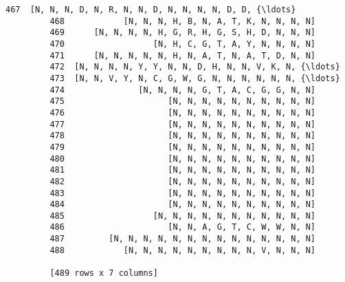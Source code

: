 \documentclass[11pt]{article}
\begin{document}
\begin{Verbatim}[commandchars=\\\{\}]
         467  [N, N, N, D, N, R, N, N, D, N, N, N, N, D, D, {\ldots}  
         468            [N, N, N, H, B, N, A, T, K, N, N, N, N]  
         469      [N, N, N, N, H, G, R, H, G, S, H, D, N, N, N]  
         470                  [N, H, C, G, T, A, Y, N, N, N, N]  
         471      [N, N, N, N, N, H, N, A, T, N, A, T, D, N, N]  
         472  [N, N, N, N, Y, Y, N, N, D, H, N, N, V, K, N, {\ldots}  
         473  [N, N, V, Y, N, C, G, W, G, N, N, N, N, N, N, {\ldots}  
         474               [N, N, N, N, G, T, A, C, G, G, N, N]  
         475                     [N, N, N, N, N, N, N, N, N, N]  
         476                     [N, N, N, N, N, N, N, N, N, N]  
         477                     [N, N, N, N, N, N, N, N, N, N]  
         478                     [N, N, N, N, N, N, N, N, N, N]  
         479                     [N, N, N, N, N, N, N, N, N, N]  
         480                     [N, N, N, N, N, N, N, N, N, N]  
         481                     [N, N, N, N, N, N, N, N, N, N]  
         482                     [N, N, N, N, N, N, N, N, N, N]  
         483                     [N, N, N, N, N, N, N, N, N, N]  
         484                     [N, N, N, N, N, N, N, N, N, N]  
         485                  [N, N, N, N, N, N, N, N, N, N, N]  
         486                     [N, N, A, G, T, C, W, W, N, N]  
         487         [N, N, N, N, N, N, N, N, N, N, N, N, N, N]  
         488            [N, N, N, N, N, N, N, N, N, V, N, N, N]  
         
         [489 rows x 7 columns]
\end{Verbatim}
            

    
    
    
    
\end{document}
